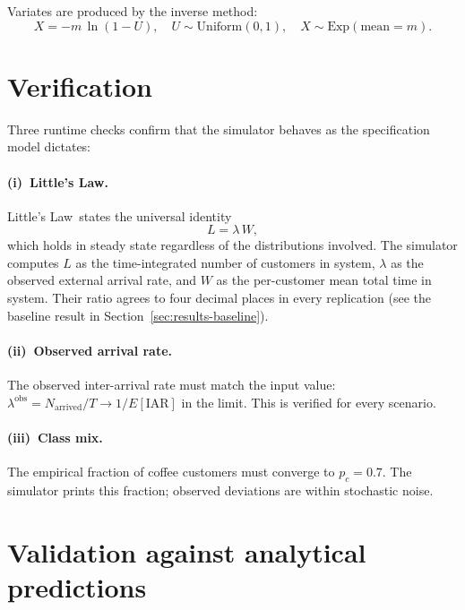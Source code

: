 \documentclass[11pt,a4paper]{article}
\begin{document}
Variates are produced by the inverse method:
\begin{equation}
X = -m \,\ln(1-U), \quad U \sim \mathrm{Uniform}(0,1), \quad
X \sim \mathrm{Exp}(\text{mean} = m).
\end{equation}

\section{Verification}

Three runtime checks confirm that the simulator behaves as the
specification model dictates:

\paragraph{(i)~Little's Law.}
Little's Law\,\cite{harchol_balter} states the universal identity
\begin{equation}
L = \lambda\,W, \label{eq:little}
\end{equation}
which holds in steady state regardless of the distributions involved.
The simulator computes $L$ as the time-integrated number of customers
in system, $\lambda$ as the observed external arrival rate, and $W$ as
the per-customer mean total time in system. Their ratio agrees
to four decimal places in every replication (see the baseline result
in Section~\ref{sec:results-baseline}).

\paragraph{(ii)~Observed arrival rate.}
The observed inter-arrival rate must match the input value:
$\lambda^{\text{obs}} = N_{\text{arrived}}/T \to 1/E[\text{IAR}]$ in the
limit. This is verified for every scenario.

\paragraph{(iii)~Class mix.}
The empirical fraction of coffee customers must converge to
$p_c = 0.7$. The simulator prints this fraction; observed deviations
are within stochastic noise.

\section{Validation against analytical predictions}
\label{sec:validation}
\end{document}
